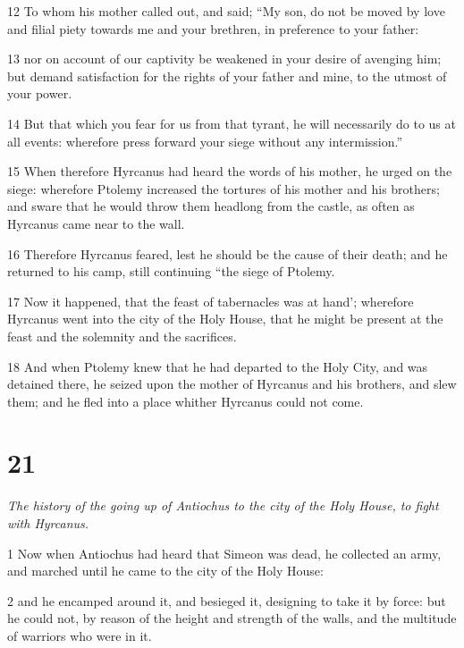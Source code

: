 \par 12 To whom his mother called out, and said; “My son, do not be moved by love and filial piety towards me and your brethren, in preference to your father: 

\par 13 nor on account of our captivity be weakened in your desire of avenging him; but demand satisfaction for the rights of your father and mine, to the utmost of your power. 

\par 14 But that which you fear for us from that tyrant, he will necessarily do to us at all events: wherefore press forward your siege without any intermission.” 

\par 15 When therefore Hyrcanus had heard the words of his mother, he urged on the siege: wherefore Ptolemy increased the tortures of his mother and his brothers; and sware that he would throw them headlong from the castle, as often as Hyrcanus came near to the wall. 

\par 16 Therefore Hyrcanus feared, lest he should be the cause of their death; and he returned to his camp, still continuing “the siege of Ptolemy. 

\par 17 Now it happened, that the feast of tabernacles was at hand’; wherefore Hyrcanus went into the city of the Holy House, that he might be present at the feast and the solemnity and the sacrifices. 

\par 18 And when Ptolemy knew that he had departed to the Holy City, and was detained there, he seized upon the mother of Hyrcanus and his brothers, and slew them; and he fled into a place whither Hyrcanus could not come. 



\chapter{21}

\par \textit{The history of the going up of Antiochus to the city of the Holy House, to fight with Hyrcanus.}

\par 1 Now when Antiochus had heard that Simeon was dead, he collected an army, and marched until he came to the city of the Holy House: 

\par 2 and he encamped around it, and besieged it, designing to take it by force: but he could not, by reason of the height and strength of the walls, and the multitude of warriors who were in it. 

